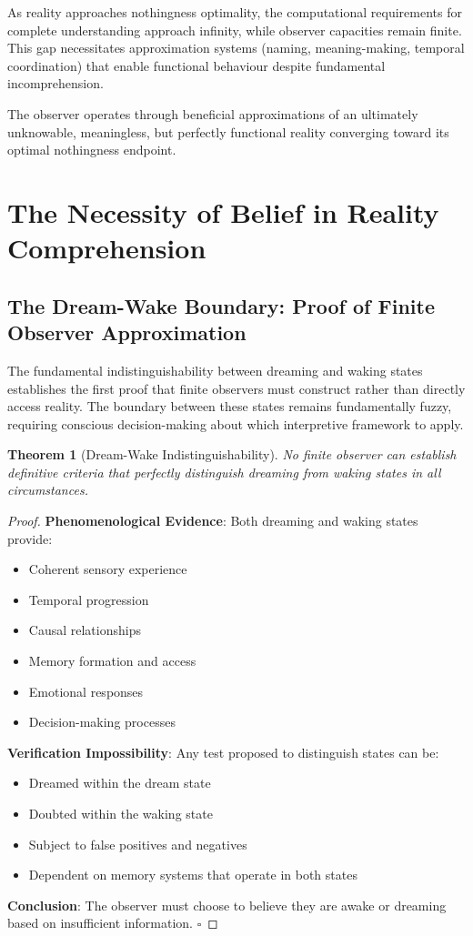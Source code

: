 \documentclass[12pt,a4paper]{article}
\newtheorem{theorem}{Theorem}
\begin{document}
As reality approaches nothingness optimality, the computational requirements for complete understanding approach infinity, while observer capacities remain finite. This gap necessitates approximation systems (naming, meaning-making, temporal coordination) that enable functional behaviour despite fundamental incomprehension.

The observer operates through beneficial approximations of an ultimately unknowable, meaningless, but perfectly functional reality converging toward its optimal nothingness endpoint.

\section{The Necessity of Belief in Reality Comprehension}

\subsection{The Dream-Wake Boundary: Proof of Finite Observer Approximation}

The fundamental indistinguishability between dreaming and waking states establishes the first proof that finite observers must construct rather than directly access reality. The boundary between these states remains fundamentally fuzzy, requiring conscious decision-making about which interpretive framework to apply.

\begin{theorem}[Dream-Wake Indistinguishability]
No finite observer can establish definitive criteria that perfectly distinguish dreaming from waking states in all circumstances.
\end{theorem}

\begin{proof}
\textbf{Phenomenological Evidence}: Both dreaming and waking states provide:
\begin{itemize}
  \item Coherent sensory experience
  \item Temporal progression
  \item Causal relationships
  \item Memory formation and access
  \item Emotional responses
  \item Decision-making processes
\end{itemize}
\textbf{Verification Impossibility}: Any test proposed to distinguish states can be:
\begin{itemize}
  \item Dreamed within the dream state
  \item Doubted within the waking state
  \item Subject to false positives and negatives
  \item Dependent on memory systems that operate in both states
\end{itemize}
\textbf{Conclusion}: The observer must choose to believe they are awake or dreaming based on insufficient information. \( \square \)
\end{proof}
\end{document}
